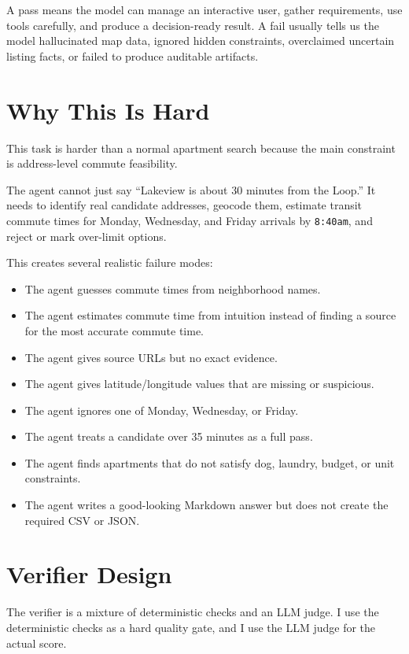 \documentclass[11pt]{article}
\begin{document}
A pass means the model can manage an interactive user, gather requirements, use
tools carefully, and produce a decision-ready result. A fail usually tells us
the model hallucinated map data, ignored hidden constraints, overclaimed
uncertain listing facts, or failed to produce auditable artifacts.

\section{Why This Is Hard}

This task is harder than a normal apartment search because the main constraint
is address-level commute feasibility.

The agent cannot just say ``Lakeview is about 30 minutes from the Loop.'' It
needs to identify real candidate addresses, geocode them, estimate transit
commute times for Monday, Wednesday, and Friday arrivals by \texttt{8:40am},
and reject or mark over-limit options.

This creates several realistic failure modes:

\begin{itemize}
  \item The agent guesses commute times from neighborhood names.
  \item The agent estimates commute time from intuition instead of finding a
  source for the most accurate commute time.
  \item The agent gives source URLs but no exact evidence.
  \item The agent gives latitude/longitude values that are missing or suspicious.
  \item The agent ignores one of Monday, Wednesday, or Friday.
  \item The agent treats a candidate over 35 minutes as a full pass.
  \item The agent finds apartments that do not satisfy dog, laundry, budget, or unit constraints.
  \item The agent writes a good-looking Markdown answer but does not create the required CSV or JSON.
\end{itemize}

\section{Verifier Design}

The verifier is a mixture of deterministic checks and an LLM judge. I use the
deterministic checks as a hard quality gate, and I use the LLM judge for the
actual score.
\end{document}
